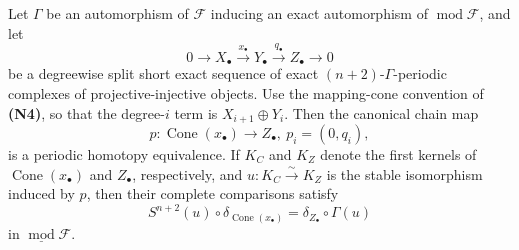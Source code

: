 \documentclass[12pt, twoside]{article}
\numberwithin{equation}{section}
\begin{document}
\begin{lemma}\label{333}
Let $\Gamma$ be an automorphism of $\mathcal F$ inducing an exact automorphism of $\operatorname{mod}\mathcal F$, and let
\begin{equation}\label{eq:split-complexes}
0\longrightarrow X_\bullet\xrightarrow{x_\bullet}Y_\bullet\xrightarrow{q_\bullet}Z_\bullet\longrightarrow0
\end{equation}
be a degreewise split short exact sequence of exact $(n+2)$-$\Gamma$-periodic complexes of projective-injective objects. Use the mapping-cone convention of \textbf{(N4)}, so that the degree-$i$ term is $X_{i+1}\oplus Y_i$. Then the canonical chain map
\[
p\colon \operatorname{Cone}(x_\bullet)\longrightarrow Z_\bullet,
~p_i=(0,q_i),
\]
is a periodic homotopy equivalence. If $K_C$ and $K_Z$ denote the first kernels of $\operatorname{Cone}(x_\bullet)$ and $Z_\bullet$, respectively, and
$
u\colon K_C\xrightarrow{\sim}K_Z
$
is the stable isomorphism induced by $p$, then their complete comparisons satisfy
\begin{equation}\label{eq:comparison-naturality}
S^{n+2}(u)\circ\delta_{\operatorname{Cone}(x_\bullet)}
=\delta_{Z_\bullet}\circ\Gamma(u)
\end{equation}
in $\underline{\operatorname{mod}}\mathcal F$.
\end{lemma}
\end{document}
